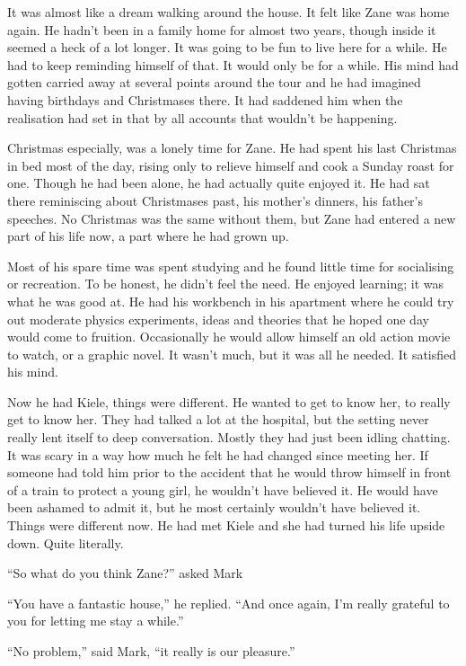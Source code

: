 It was almost like a dream walking around the house.  It felt like Zane was home again.  He hadn't been in a family home for almost two years, though inside it seemed a heck of a lot longer.  It was going to be fun to live here for a while.  He had to keep reminding himself of that.  It would only be for a while.  His mind had gotten carried away at several points around the tour and he had imagined having birthdays and Christmases there.  It had saddened him when the realisation had set in that by all accounts that wouldn't be happening.

Christmas especially, was a lonely time for Zane.  He had spent his last Christmas in bed most of the day, rising only to relieve himself and cook a Sunday roast for one.  Though he had been alone, he had actually quite enjoyed it.  He had sat there reminiscing about Christmases past, his mother's dinners, his father's speeches.  No Christmas was the same without them, but Zane had entered a new part of his life now, a part where he had grown up.  

Most of his spare time was spent studying and he found little time for socialising or recreation.  To be honest, he didn't feel the need.  He enjoyed learning; it was what he was good at.  He had his workbench in his apartment where he could try out moderate physics experiments, ideas and theories that he hoped one day would come to fruition.  Occasionally he would allow himself an old action movie to watch, or a graphic novel.  It wasn't much, but it was all he needed.  It satisfied his mind.

Now he had Kiele, things were different.  He wanted to get to know her, to really get to know her.  They had talked a lot at the hospital, but the setting never really lent itself to deep conversation.  Mostly they had just been idling chatting.  It was scary in a way how much he felt he had changed since meeting her.  If someone had told him prior to the accident that he would throw himself in front of a train to protect a young girl, he wouldn't have believed it.  He would have been ashamed to admit it, but he most certainly wouldn't have believed it.  Things were different now.  He had met Kiele and she had turned his life upside down.  Quite literally.  

``So what do you think Zane?'' asked Mark

``You have a fantastic house,'' he replied.  ``And once again, I'm really grateful to you for letting me stay a while.''

``No problem,'' said Mark, ``it really is our pleasure.''

